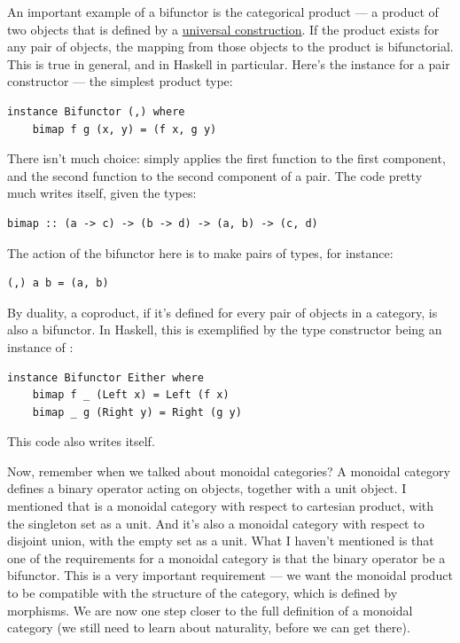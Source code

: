 An important example of a bifunctor is the categorical product --- a
product of two objects that is defined by a \hyperref[products-and-coproducts]{universal
construction}. If the product exists for any pair of objects, the
mapping from those objects to the product is bifunctorial. This is true
in general, and in Haskell in particular. Here's the 
instance for a pair constructor --- the simplest product type:

\begin{Verbatim}[commandchars=\\\{\}]
instance Bifunctor (,) where 
    bimap f g (x, y) = (f x, g y)
\end{Verbatim}
There isn't much choice:  simply applies the first
function to the first component, and the second function to the second
component of a pair. The code pretty much writes itself, given the
types:

\begin{Verbatim}[commandchars=\\\{\}]
bimap :: (a -> c) -> (b -> d) -> (a, b) -> (c, d)
\end{Verbatim}
The action of the bifunctor here is to make pairs of types, for
instance:

\begin{Verbatim}[commandchars=\\\{\}]
(,) a b = (a, b)
\end{Verbatim}
By duality, a coproduct, if it's defined for every pair of objects in a
category, is also a bifunctor. In Haskell, this is exemplified by the
 type constructor being an instance of
:

\begin{Verbatim}[commandchars=\\\{\}]
instance Bifunctor Either where
    bimap f _ (Left x) = Left (f x)
    bimap _ g (Right y) = Right (g y)
\end{Verbatim}
This code also writes itself.

Now, remember when we talked about monoidal categories? A monoidal
category defines a binary operator acting on objects, together with a
unit object. I mentioned that  is a monoidal category with
respect to cartesian product, with the singleton set as a unit. And it's
also a monoidal category with respect to disjoint union, with the empty
set as a unit. What I haven't mentioned is that one of the requirements
for a monoidal category is that the binary operator be a bifunctor. This
is a very important requirement --- we want the monoidal product to be
compatible with the structure of the category, which is defined by
morphisms. We are now one step closer to the full definition of a
monoidal category (we still need to learn about naturality, before we
can get there).

